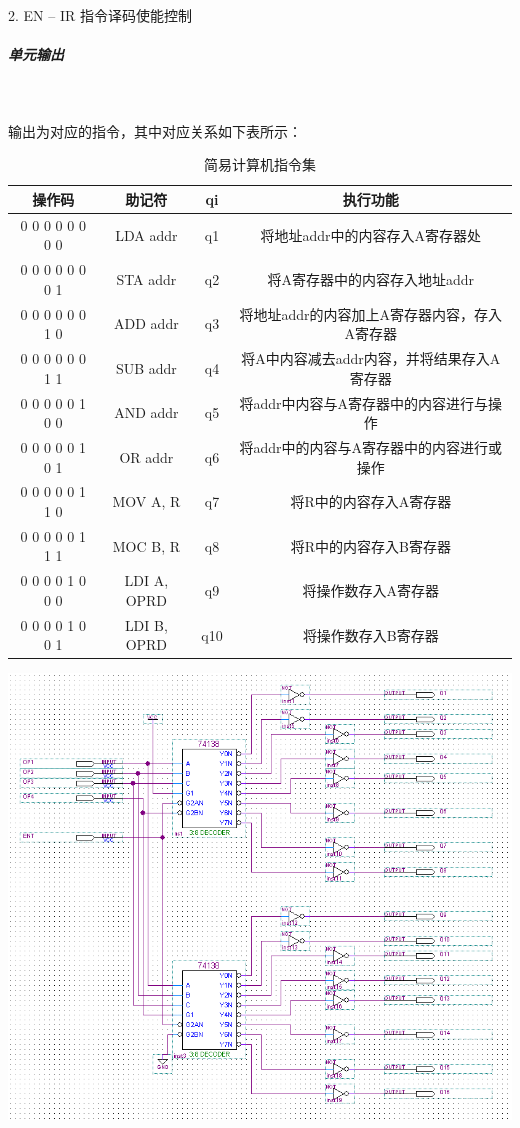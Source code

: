 \documentclass[UTF8]{ctexart}
\begin{document}
    2. EN -- IR 指令译码使能控制

    \subparagraph{单元输出}

    ~

    输出为对应的指令，其中对应关系如下表所示：

    \begin{table}[!htb]
      \centering
      \begin{tabular}{|c|c|c|c|}
        \hline
        操作码 & 助记符 & qi &执行功能 \\
        \hline
        0 0 0 0 0 0 0 0 & LDA addr & q1 & 将地址addr中的内容存入A寄存器处 \\
        0 0 0 0 0 0 0 1 & STA addr & q2 & 将A寄存器中的内容存入地址addr \\
        \hline
        0 0 0 0 0 0 1 0 & ADD addr & q3 & 将地址addr的内容加上A寄存器内容，存入A寄存器 \\
        0 0 0 0 0 0 1 1 & SUB addr & q4 & 将A中内容减去addr内容，并将结果存入A寄存器 \\
        \hline
        0 0 0 0 0 1 0 0 & AND addr & q5 & 将addr中内容与A寄存器中的内容进行与操作 \\
        0 0 0 0 0 1 0 1 & OR addr & q6 & 将addr中的内容与A寄存器中的内容进行或操作 \\
        \hline
        0 0 0 0 0 1 1 0 & MOV A, R & q7 & 将R中的内容存入A寄存器 \\
        0 0 0 0 0 1 1 1 & MOC B, R & q8 & 将R中的内容存入B寄存器 \\
        \hline
        0 0 0 0 1 0 0 0 & LDI A, OPRD & q9 & 将操作数存入A寄存器\\
        0 0 0 0 1 0 0 1 & LDI B, OPRD & q10 &  将操作数存入B寄存器\\
        \hline
      \end{tabular}
      \caption{简易计算机指令集}\label{简易计算机指令集}
    \end{table}

    \includegraphics[width=1.0\textwidth]{./img/指令寄存器IR原理图.png}
\end{document}
